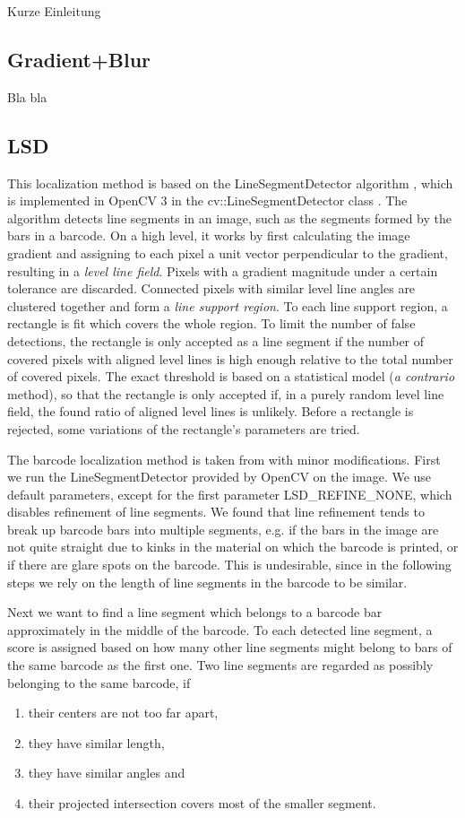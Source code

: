 Kurze Einleitung

\subsection{Gradient+Blur}
Bla bla
\subsection{LSD}\label{sec:LSD}
This localization method is based on the LineSegmentDetector algorithm
\cite{GromponevonGioi2012}, which is implemented in OpenCV 3 in the
cv::LineSegmentDetector class \cite{Bradski2017}. The algorithm detects line
segments in an image, such as the segments formed by the bars in a barcode.
On a high level, it works by first calculating the image gradient and assigning
to each pixel a unit vector perpendicular to the gradient, resulting in a
\emph{level line field}. Pixels with a gradient magnitude under a certain
tolerance are discarded. Connected pixels with similar level line angles are clustered
together and form a \emph{line support region}. To each line support region, a
rectangle is fit which covers the whole region. To limit the number of false
detections, the rectangle is only accepted as a line segment if the number of
covered pixels with aligned level lines is high enough relative to the total number of
covered pixels. The exact threshold is based on a statistical model (\emph{a
  contrario} method), so that the rectangle is only accepted if,
in a purely random level line field, the found ratio of aligned level lines is unlikely.
Before a rectangle is rejected, some variations of the rectangle's parameters
are tried.

The barcode localization method is taken from \citeauthor{Creusot2016} with minor modifications. First we run
the LineSegmentDetector provided by OpenCV on the image. We use default
parameters, except for the first parameter LSD\_REFINE\_NONE, which disables
refinement of line segments. We found that line refinement tends to break up
barcode bars into multiple segments, e.g. if the bars in the image are not quite
straight due to kinks in the material on which the barcode is printed, or if
there are glare spots on the barcode. This is undesirable, since in the
following steps we rely on the length of line segments in the barcode to be similar.

Next we want to find a line segment which belongs to a barcode bar approximately
in the middle of the barcode. To each detected line segment, a score is assigned
based on how many other line segments might belong to bars of the same barcode as the first
one. Two line segments are regarded as possibly belonging to the same barcode, if
\begin{enumerate}
\item their centers are not too far apart,
\item they have similar length,
\item they have similar angles and
\item their projected intersection covers most of the smaller segment.
\end{enumerate}

